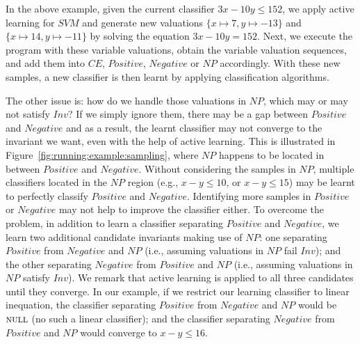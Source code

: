 \begin{example}
In the above example, given the current classifier $\mathit{3x-10y \leq 152}$, we apply active learning for $\mathit{SVM}$ 
and generate new valuations $\mathit{\{x \mapsto 7, y \mapsto -13\}}$ and $\mathit{\{x \mapsto 14, y \mapsto -11\}}$ %
by solving the equation $\mathit{3x-10y = 152}$. %
Next, we execute the program with these variable valuations, obtain the variable valuation sequences, and add them into $\mathit{CE}$, $\mathit{Positive}$, $\mathit{Negative}$ or $\mathit{NP}$ accordingly. 
With these new samples, a new classifier is then learnt by applying classification algorithms.
\end{example}
The other issue is: how do we handle those valuations in $\mathit{NP}$, which may or may not satisfy $\mathit{Inv}$? 
If we simply ignore them, there may be a gap between $\mathit{Positive}$ and $\mathit{Negative}$ 
and as a result, the learnt classifier may not converge to the invariant we want, even with the help of active learning. 
This is illustrated in Figure~\ref{fig:running:example:sampling}, where $\mathit{NP}$ happens to be located in between $\mathit{Positive}$ and $\mathit{Negative}$. 
Without considering the samples in $\mathit{NP}$, multiple classifiers located in the $\mathit{NP}$ region (e.g., $\mathit{x - y \leq 10}$, or $\mathit{x - y \leq 15}$) may be learnt to perfectly classify $\mathit{Positive}$ and $\mathit{Negative}$. 
Identifying more samples in $\mathit{Positive}$ or $\mathit{Negative}$ may not help to improve the classifier either. 
To overcome the problem, in addition to learn a classifier separating $\mathit{Positive}$ and $\mathit{Negative}$, we learn two additional candidate invariants making use of $\mathit{NP}$: 
one separating $\mathit{Positive}$ from $\mathit{Negative}$ and $\mathit{NP}$ (i.e., assuming valuations in $\mathit{NP}$ fail $\mathit{Inv}$); 
and the other separating $\mathit{Negative}$ from $\mathit{Positive}$ and $\mathit{NP}$ (i.e., assuming valuations in $\mathit{NP}$ satisfy $\mathit{Inv}$). 
We remark that active learning is applied to all three candidates until they converge. 
In our example, if we restrict our learning classifier to linear inequation, 
the classifier separating $\mathit{Positive}$ from $\mathit{Negative}$ and $\mathit{NP}$ would be $\textsc{null}$ (no such a linear classifier); %
and the classifier separating $\mathit{Negative}$ from $\mathit{Positive}$ and $\mathit{NP}$ would converge to $\mathit{x - y \leq 16}$.

